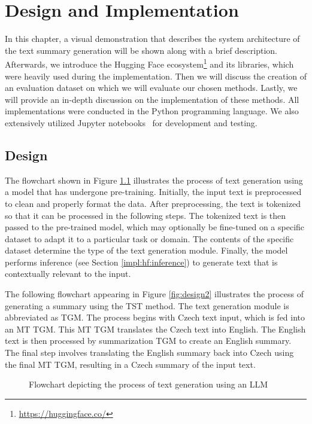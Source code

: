 \documentclass[english, ba, kiv, he, iso690numb, pdf, viewonly]{fasthesis}
\begin{document}
\chapter{Design and Implementation} \label{char:implementation}
In this chapter, a visual demonstration that describes the system architecture of the text summary generation will be shown along with a brief description. Afterwards, we introduce the Hugging Face ecosystem\footnote{\url{https://huggingface.co/}} and its libraries, which were heavily used during the implementation. Then we will discuss the creation of an evaluation dataset on which we will evaluate our chosen methods. Lastly, we will provide an in-depth discussion on the implementation of these methods. All implementations were conducted in the Python programming language. We also extensively utilized Jupyter notebooks~\cite{Kluyver2016jupyter} for development and testing.

\section{Design}
The flowchart shown in Figure \ref{fig:design1} illustrates the process of text generation using a model that has undergone pre-training. Initially, the input text is preprocessed to clean and properly format the data. After preprocessing, the text is tokenized so that it can be processed in the following steps. The tokenized text is then passed to the pre-trained model, which may optionally be fine-tuned on a specific dataset to adapt it to a particular task or domain. The contents of the specific dataset determine the type of the text generation module. Finally, the model performs inference (see Section \ref{impl:hf:inference}) to generate text that is contextually relevant to the input.

The following flowchart appearing in Figure \ref{fig:design2} illustrates the process of generating a summary using the TST method. The text generation module is abbreviated as TGM. The process begins with Czech text input, which is fed into an MT TGM. This MT TGM translates the Czech text into English. The English text is then processed by summarization TGM to create an English summary. The final step involves translating the English summary back into Czech using the final MT TGM, resulting in a Czech summary of the input text.
\begin{figure}[ht]
\centering
\caption{Flowchart depicting the process of text generation using an LLM}
\setlength{\fboxsep}{10pt}
\label{fig:design1}
\end{figure}
\end{document}

